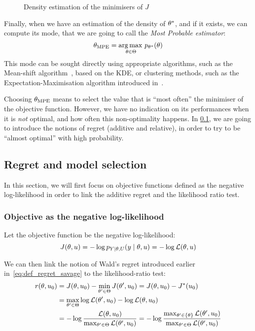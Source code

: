 \documentclass[../../Main_ManuscritThese.tex]{subfiles}
\newcommand\imgpath{/home/victor/acadwriting/Manuscrit/Text/Chapter3/img/}
\begin{document}
\begin{figure}[ht]
  \centering
  
  \caption{\label{fig:theta_star_samples} Density estimation of the minimisers of $J$}
\end{figure}

Finally, when we have an estimation of the density of $\theta^*$, and if
it exists, we can compute its mode, that we are going to call the
\emph{Most Probable estimator}:
\begin{equation}
  {\theta}_{\mathrm{MPE}} = \operatorname*{arg\,max \,}_{\theta \in \Theta} p_{\theta^*}(\theta)
\end{equation}
This mode can be sought directly using appropriate algorithms, such as
the Mean-shift algorithm~\citep{yizong_cheng_mean_1995}, based on the
KDE, or clustering methods, such as the Expectation-Maximisation
algorithm introduced in~\cite{dempster_maximum_1977}.

Choosing ${\theta}_{\mathrm{MPE}}$ means to select the value that is
``most often'' the minimiser of the objective function. However, we
have no indication on its performances when it is \emph{not} optimal,
and how often this non-optimality happens.  In \cref{sec:regret}, we
are going to introduce the notions of regret (additive and relative),
in order to try to be ``almost optimal'' with high probability.


\subsection{Regret and model selection}
\label{sec:regret}
In this section, we will first focus on objective functions defined as
the negative log-likelihood in order to link the additive regret and
the likelihood ratio test.
\subsubsection{Objective as the negative log-likelihood}

Let the objective function be the negative log-likelihood:
\begin{equation}
  J(\theta, u) = - \log p_{Y\mid \theta, U}(y \mid \theta, u) = -\log \mathcal{L}(\theta,u)
\end{equation}

We can then link the notion of Wald's regret introduced earlier
in~\cref{eq:def_regret_savage} to the likelihood-ratio test:
  \begin{align}
    r(\theta,u_0) &= J(\theta, u_0) - \min_{\theta^{\prime}\in\Theta}J(\theta^{\prime}, u_0) = J(\theta,u_0) - J^*(u_0)  \\
                 &= \max_{\theta^{\prime}\in\Theta} \log \mathcal{L}(\theta^{\prime}, u_0) - \log \mathcal{L}(\theta, u_0) \\
                 &= -\log \frac{\mathcal{L}(\theta, u_0)}{\max_{\theta^{\prime}\in\Theta}\mathcal{L}(\theta^{\prime}, u_0)} = -\log \frac{\max_{\theta^{\prime}\in\{\theta\}}\mathcal{L}(\theta^{\prime}, u_0)}{\max_{\theta^{\prime}\in\Theta}\mathcal{L}(\theta^{\prime}, u_0)}
  \end{align}
\end{document}

